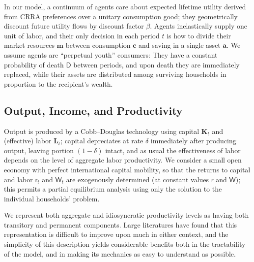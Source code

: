 \documentclass[titlepage]{./econtex}
\begin{document}
In our model, a continuum of agents care about expected lifetime utility derived from CRRA preferences over a unitary consumption good; they geometrically discount future utility flows by discount factor $\beta$.  Agents inelastically supply one unit of labor, and their only decision in each period $t$ is how to divide their market resources $\mathbf{m}$ between consumption $\mathbf{c}$ and saving in a single asset $\mathbf{a}$.  We assume agents are \cite{blanchardFinite} ``perpetual youth'' consumers: They have a constant probability of death $\mathsf{D}$ between periods, and upon death they are immediately replaced, while their assets are distributed among surviving households in proportion to the recipient's wealth.

\subsection{Output, Income, and Productivity}

Output is produced by a Cobb--Douglas technology using capital $\mathbf{K}_t$ and (effective) labor $\mathbf{L}_t$; capital depreciates at rate $\delta$ immediately after producing output, leaving portion $(1-\delta)$ intact, and as usual the effectiveness of labor depends on the level of aggregate labor productivity.  We consider a small open economy with perfect international capital mobility, so that the returns to capital and labor $\mathsf{r}_t$ and $\mathsf{W}_t$ are exogenously determined (at constant values $\mathsf{r}$ and $\mathsf{W}$); this permits a partial equilibrium analysis using only the solution to the individual households' problem. 

We represent both aggregate and idiosyncratic productivity levels as having both transitory and permanent components.  Large literatures have found that this representation is difficult to improve upon much in either context, and the simplicity of this description yields considerable benefits both in the tractability of the model, and in making its mechanics as easy to understand as possible.
\end{document}

